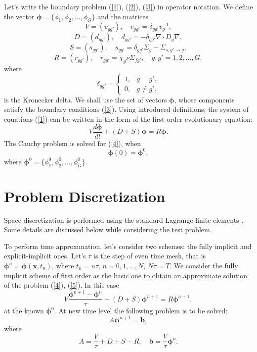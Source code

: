 \documentclass{llncs}
\begin{document}
Let's write the boundary problem (\ref{1}), (\ref{2}), (\ref{3}) in operator notation. 
We define the vector $\bm \phi = \{\phi_1, \phi_2, ..., \phi_G\}$ and the matrices
\[
 V = (v_{g g'}),
 \quad v_{g g'} = \delta_{g g'} v_g^{-1},
\] 
\[
 D = (d_{g g'}),
 \quad d_{g g'} = - \delta_{g g'} \nabla \cdot D_g \nabla,
\] 
\[
 S = (s_{g g'}),
 \quad  s_{g g'} =  \delta_{g g'} \Sigma_g - \Sigma_{s,g'\rightarrow g} ,
\] 
\[
 R = (r_{g g'}),
 \quad  r_{g g'} = \chi_g \nu \Sigma_{fg'} ,
 \quad g, g' = 1,2, ..., G,
\] 
where
\[
 \delta_{g g'} = \left \{ 
 \begin{matrix}
 1, & g = g', \\
 0, & g \neq  g',
 \end{matrix}
 \right . 
\] 
is the Kronecker delta. We shall use the set of vectors $\bm \phi$,  whose components satisfy the boundary conditions
(\ref{3}). Using introduced definitions, the system of equations (\ref{1}) can be written in the form of the first-order evolutionary equation:
\begin{equation}\label{4}
 V \frac{d \bm \phi}{d t} + (D+S) \bm \phi = R \bm \phi .
\end{equation}  
The Cauchy problem is solved for (\ref{4}), when
\begin{equation}\label{5}
 \bm \phi(0) = \bm \phi^0,
\end{equation} 
where $\bm \phi^0 = \{ \phi_1^0,  \phi_2^0, ...,  \phi_G^0 \}$.

\section{Problem Discretization}

Space discretization is performed using the standard Lagrange finite elements \cite{brenner}. Some details are discussed below while considering the test problem.
 
To perform time approximation, let's consider two schemes: the fully implicit and explicit-implicit ones. Let's $\tau$ is the step of even time mesh, that is $\bm\phi^{n}=\bm\phi(\bm x,t_n)$, where $t_n=n\tau$, $n=0,1,...,N$, $N\tau=T$.  
We consider the fully implicit scheme of first order \cite{Samarskii} as the basic one to obtain an approximate solution of the problem (\ref{4}), (\ref{5}). In this case 
\begin{equation}\label{6}
 V\frac{\bm\phi^{n+1}-\bm\phi^n}{\tau}+(D+S)\bm\phi^{n+1} = R \bm\phi^{n+1},
\end{equation} 
at the known $\bm\phi^{0}$.
At new time level the following problem is to be solved:
\begin{equation}\label{7}
  A \bm\phi^{n+1} = \bm b,
\end{equation} 
where
\[
 A = \frac{V}{\tau}+D+S-R , 
 \quad  \bm b = \frac{V}{\tau}\bm\phi^n.
\]
\end{document}
